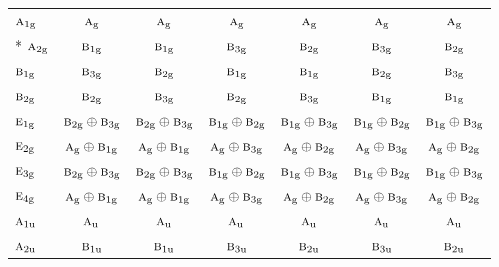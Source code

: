 \documentclass[10pt,a4paper]{article}
\numberwithin{equation}{section}
\newcommand{\irr}[1]{\text{\normalfont\scshape #1}}
\newcommand{\ptag}[1]{\mathrm{#1}}
\begin{document}
{\begin{longtable}{@{}lcccccc@{}}
\bottomrule\endfoot\endlastfoot
$\irr{a}_{1\ptag{g}}$ & $\irr{a}_{\ptag{g}}$ & $\irr{a}_{\ptag{g}}$ & $\irr{a}_{\ptag{g}}$ & $\irr{a}_{\ptag{g}}$ & $\irr{a}_{\ptag{g}}$ & $\irr{a}_{\ptag{g}}$\\*
$\irr{a}_{2\ptag{g}}$ & $\irr{b}_{1\ptag{g}}$ & $\irr{b}_{1\ptag{g}}$ & $\irr{b}_{3\ptag{g}}$ & $\irr{b}_{2\ptag{g}}$ & $\irr{b}_{3\ptag{g}}$ & $\irr{b}_{2\ptag{g}}$\\
$\irr{b}_{1\ptag{g}}$ & $\irr{b}_{3\ptag{g}}$ & $\irr{b}_{2\ptag{g}}$ & $\irr{b}_{1\ptag{g}}$ & $\irr{b}_{1\ptag{g}}$ & $\irr{b}_{2\ptag{g}}$ & $\irr{b}_{3\ptag{g}}$\\
$\irr{b}_{2\ptag{g}}$ & $\irr{b}_{2\ptag{g}}$ & $\irr{b}_{3\ptag{g}}$ & $\irr{b}_{2\ptag{g}}$ & $\irr{b}_{3\ptag{g}}$ & $\irr{b}_{1\ptag{g}}$ & $\irr{b}_{1\ptag{g}}$\\
$\irr{e}_{1\ptag{g}}$ & $\irr{b}_{2\ptag{g}}\oplus \irr{b}_{3\ptag{g}}$ & $\irr{b}_{2\ptag{g}}\oplus \irr{b}_{3\ptag{g}}$ & $\irr{b}_{1\ptag{g}}\oplus \irr{b}_{2\ptag{g}}$ & $\irr{b}_{1\ptag{g}}\oplus \irr{b}_{3\ptag{g}}$ & $\irr{b}_{1\ptag{g}}\oplus \irr{b}_{2\ptag{g}}$ & $\irr{b}_{1\ptag{g}}\oplus \irr{b}_{3\ptag{g}}$\\
$\irr{e}_{2\ptag{g}}$ & $\irr{a}_{\ptag{g}}\oplus \irr{b}_{1\ptag{g}}$ & $\irr{a}_{\ptag{g}}\oplus \irr{b}_{1\ptag{g}}$ & $\irr{a}_{\ptag{g}}\oplus \irr{b}_{3\ptag{g}}$ & $\irr{a}_{\ptag{g}}\oplus \irr{b}_{2\ptag{g}}$ & $\irr{a}_{\ptag{g}}\oplus \irr{b}_{3\ptag{g}}$ & $\irr{a}_{\ptag{g}}\oplus \irr{b}_{2\ptag{g}}$\\
$\irr{e}_{3\ptag{g}}$ & $\irr{b}_{2\ptag{g}}\oplus \irr{b}_{3\ptag{g}}$ & $\irr{b}_{2\ptag{g}}\oplus \irr{b}_{3\ptag{g}}$ & $\irr{b}_{1\ptag{g}}\oplus \irr{b}_{2\ptag{g}}$ & $\irr{b}_{1\ptag{g}}\oplus \irr{b}_{3\ptag{g}}$ & $\irr{b}_{1\ptag{g}}\oplus \irr{b}_{2\ptag{g}}$ & $\irr{b}_{1\ptag{g}}\oplus \irr{b}_{3\ptag{g}}$\\
$\irr{e}_{4\ptag{g}}$ & $\irr{a}_{\ptag{g}}\oplus \irr{b}_{1\ptag{g}}$ & $\irr{a}_{\ptag{g}}\oplus \irr{b}_{1\ptag{g}}$ & $\irr{a}_{\ptag{g}}\oplus \irr{b}_{3\ptag{g}}$ & $\irr{a}_{\ptag{g}}\oplus \irr{b}_{2\ptag{g}}$ & $\irr{a}_{\ptag{g}}\oplus \irr{b}_{3\ptag{g}}$ & $\irr{a}_{\ptag{g}}\oplus \irr{b}_{2\ptag{g}}$\\
$\irr{a}_{1\ptag{u}}$ & $\irr{a}_{\ptag{u}}$ & $\irr{a}_{\ptag{u}}$ & $\irr{a}_{\ptag{u}}$ & $\irr{a}_{\ptag{u}}$ & $\irr{a}_{\ptag{u}}$ & $\irr{a}_{\ptag{u}}$\\
$\irr{a}_{2\ptag{u}}$ & $\irr{b}_{1\ptag{u}}$ & $\irr{b}_{1\ptag{u}}$ & $\irr{b}_{3\ptag{u}}$ & $\irr{b}_{2\ptag{u}}$ & $\irr{b}_{3\ptag{u}}$ & $\irr{b}_{2\ptag{u}}$\\

\end{longtable}}
\end{document}
